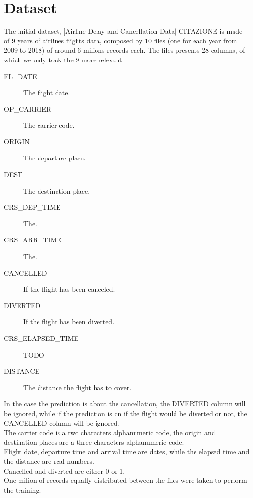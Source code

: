 \documentclass[
	letterpaper, %
	10pt, %
]{class}
\begin{document}

\section{Dataset}

The initial dataset, [Airline Delay and Cancellation Data] CITAZIONE is made of 9 years of airlines flights data, composed by 10 files (one for each year from 2009 to 2018) of around 6 milions records each.
The files presents 28 columns, of which we only took the 9 more relevant\\

\begin{description}
	\item[FL\_DATE] The flight date.
	\item[OP\_CARRIER] The carrier code.
	\item[ORIGIN] The departure place.
	\item[DEST] The destination place.
	\item[CRS\_DEP\_TIME] The.
	\item[CRS\_ARR\_TIME] The.
	\item[CANCELLED] If the flight has been canceled.
	\item[DIVERTED] If the flight has been diverted.
	\item[CRS\_ELAPSED\_TIME] TODO
	\item[DISTANCE] The distance the flight has to cover.\\
\end{description}

In the case the prediction is about the cancellation, the DIVERTED column will be ignored, while if the prediction is on if the flight would be diverted or not, the CANCELLED column will be ignored.\\
The carrier code is a two characters alphanumeric code, the origin and destination places are a three characters alphanumeric code.\\
Flight date, departure time and arrival time are dates, while the elapsed time and the distance are real numbers.\\
Cancelled and diverted are either 0 or 1.\\

One milion of records equally distributed between the files were taken to perform the training.
\end{document}
